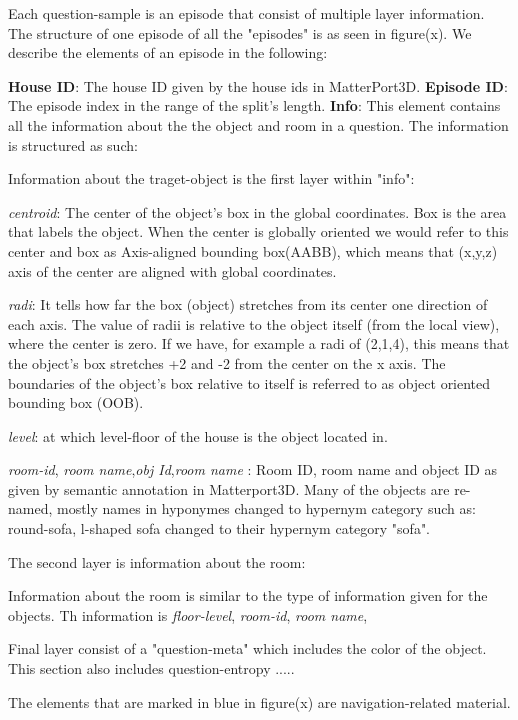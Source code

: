 Each question-sample is an episode that consist of multiple layer information. The structure of one episode of all the "episodes" is as seen in figure(x). We describe the elements of an episode in the following:  

\textbf{House ID}: The house ID given by the house ids in MatterPort3D.
\textbf{Episode ID}: The episode index in the range of the split's length. \hspace{1.5cm}
\textbf{Info}: This element contains all the information about the the object and room in a question. The information is structured as such: 

Information about the traget-object is the first layer within "info": 

\textit{centroid}: The center of the object's box in the global coordinates. Box is the area that labels  the object. When the center is globally oriented we would refer to this center and box as Axis-aligned bounding box(AABB), which means that (x,y,z) axis of the center are aligned with global coordinates. 

\textit{radi}: It tells how far the box (object) stretches from its center one direction of each axis. The value of radii is relative to the object itself (from the local view), where the center is zero. If we have, for example a radi of (2,1,4), this means that the object's box stretches +2 and -2 from the center on the x axis. The boundaries of the object's box relative to itself is referred to as object oriented bounding box (OOB). 

\textit{level}: at which level-floor of the house  is the object located in. 

\textit{room-id}, \textit{room name},\textit{obj Id},\textit{room name} : Room ID, room name and object ID as given by semantic annotation in  Matterport3D. Many of the objects are re-named, mostly names in hyponymes changed to hypernym category such as: round-sofa, l-shaped sofa changed to their hypernym category "sofa". 

The second layer is information about the room: 

Information about the room is similar to the type of information given for the objects. Th information is \textit{floor-level}, \textit{room-id}, \textit{room name},

Final layer consist of a "question-meta" which includes the color of the object. This section also includes question-entropy ..... 

The elements that are marked in blue in figure(x) are navigation-related material. 

